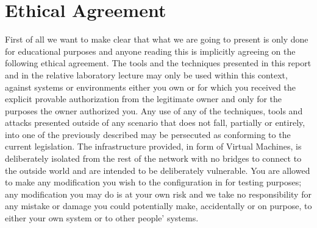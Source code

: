 \section{Ethical Agreement}
\label{sec:ethical}
First of all we want to make clear that what we are going to present is only done for educational purposes and anyone reading this is implicitly agreeing on the following ethical agreement.
\newline
The tools and the techniques presented in this report and in the relative laboratory lecture may only be used within this context, against systems or environments either you own or for which you received the explicit provable authorization from the legitimate owner and only for the purposes the owner authorized you.
\newline
Any use of any of the techniques, tools and attacks presented outside of any scenario that does not fall, partially or entirely, into one of the previously described may be persecuted as conforming to the current legislation.
\newline
The infrastructure provided, in form of Virtual Machines, is deliberately isolated from the rest of the network with no bridges to connect to the outside world and are intended to be deliberately vulnerable. You are allowed to make any modification you wish to the configuration in for testing purposes; any modification you may do is at your own risk and we take no responsibility for any mistake or damage you could potentially make, accidentally or on purpose, to either your own system or to other people' systems.
\clearpage